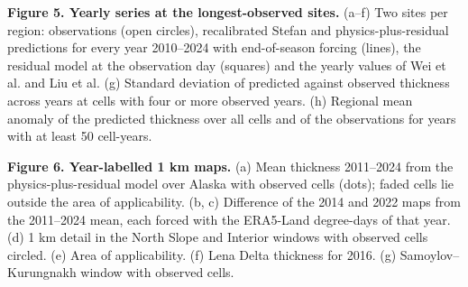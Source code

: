 \textbf{Figure 5. Yearly series at the longest-observed sites.} (a--f) Two sites per region: observations (open circles), recalibrated Stefan and physics-plus-residual predictions for every year 2010--2024 with end-of-season forcing (lines), the residual model at the observation day (squares) and the yearly values of Wei et al. and Liu et al. (g) Standard deviation of predicted against observed thickness across years at cells with four or more observed years. (h) Regional mean anomaly of the predicted thickness over all cells and of the observations for years with at least 50 cell-years.

\textbf{Figure 6. Year-labelled 1 km maps.} (a) Mean thickness 2011--2024 from the physics-plus-residual model over Alaska with observed cells (dots); faded cells lie outside the area of applicability. (b, c) Difference of the 2014 and 2022 maps from the 2011--2024 mean, each forced with the ERA5-Land degree-days of that year. (d) 1 km detail in the North Slope and Interior windows with observed cells circled. (e) Area of applicability. (f) Lena Delta thickness for 2016. (g) Samoylov--Kurungnakh window with observed cells.

